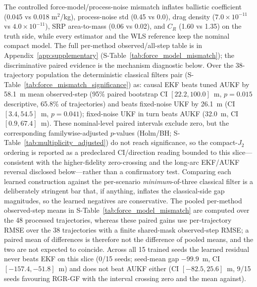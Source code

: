 \documentclass{article}
\begin{document}
The controlled force-model/process-noise mismatch inflates ballistic coefficient (0.045 vs 0.018 m\(^2\)/kg), process-noise std (0.45 vs 0.0), drag density (\(7.0\times10^{-11}\) vs \(4.0\times10^{-11}\)), SRP area-to-mass (0.06 vs 0.02), and \(C_R\) (1.60 vs 1.35) on the truth side, while every estimator and the WLS reference keep the nominal compact model. The full per-method observed/all-step table is in Appendix~\ref{app:supplementary} (S-Table~\ref{tab:force_model_mismatch}); the discriminative paired evidence is the mechanism diagnostic below. Over the 38-trajectory population the deterministic classical filters pair (S-Table~\ref{tab:force_mismatch_significance}) as: causal EKF beats tuned AUKF by 58.1~m mean observed-step (95\% paired bootstrap CI $[22.2, 100.0]$~m, $p=0.015$ descriptive, 65.8\% of trajectories) and beats fixed-noise UKF by 26.1~m (CI $[3.4, 54.5]$~m, $p=0.041$); fixed-noise UKF in turn beats AUKF (32.0~m, CI $[0.9, 67.4]$~m). These nominal-level paired intervals exclude zero, but the corresponding familywise-adjusted $p$-values (Holm/BH; S-Table~\ref{tab:multiplicity_adjusted}) do not reach significance, so the compact-$J_2$ ordering is reported as a predeclared CI/direction reading bounded to this slice---consistent with the higher-fidelity zero-crossing and the long-arc EKF/AUKF reversal disclosed below---rather than a confirmatory test. Comparing each learned construction against the per-scenario \emph{minimum}-of-three classical filter is a deliberately stringent bar that, if anything, inflates the classical-side gap magnitudes, so the learned negatives are conservative. The pooled per-method observed-step means in S-Table~\ref{tab:force_model_mismatch} are computed over the 48 processed trajectories, whereas these paired gains use per-trajectory RMSE over the 38 trajectories with a finite shared-mask observed-step RMSE; a paired mean of differences is therefore not the difference of pooled means, and the two are not expected to coincide. Across all 15 trained seeds the learned residual never beats EKF on this slice (0/15 seeds; seed-mean gap $-99.9$~m, CI $[-157.4, -51.8]$~m) and does not beat AUKF either (CI $[-82.5, 25.6]$~m, 9/15 seeds favouring RGR-GF with the interval crossing zero and the mean against).
\end{document}
